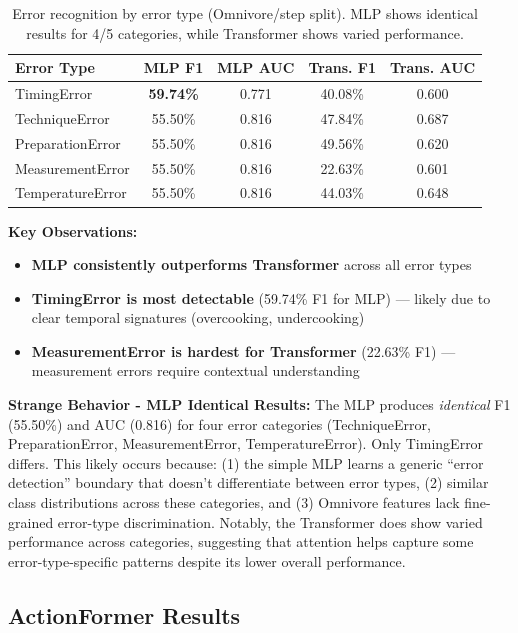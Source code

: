 \documentclass[10pt,twocolumn,letterpaper]{article}
\newcommand{\tighttabcolsep}{\setlength{\tabcolsep}{3pt}}
\newcommand{\tighttablerowstretch}{\renewcommand{\arraystretch}{1.05}}
\begin{document}
\begin{table}[h]
\centering
\caption{Error recognition by error type (Omnivore/step split). MLP shows identical results for 4/5 categories, while Transformer shows varied performance.}
\label{tab:error_types}
{\small\tighttabcolsep\tighttablerowstretch
\begin{tabular}{lcccc}
\toprule
Error Type & MLP F1 & MLP AUC & Trans. F1 & Trans. AUC \\
\midrule
TimingError & \textbf{59.74\%} & 0.771 & 40.08\% & 0.600 \\
TechniqueError & 55.50\% & 0.816 & 47.84\% & 0.687 \\
PreparationError & 55.50\% & 0.816 & 49.56\% & 0.620 \\
MeasurementError & 55.50\% & 0.816 & 22.63\% & 0.601 \\
TemperatureError & 55.50\% & 0.816 & 44.03\% & 0.648 \\
\bottomrule
\end{tabular}
}
\end{table}

\textbf{Key Observations:}
\begin{itemize}
    \item \textbf{MLP consistently outperforms Transformer} across all error types
    \item \textbf{TimingError is most detectable} (59.74\% F1 for MLP) --- likely due to clear temporal signatures (overcooking, undercooking)
    \item \textbf{MeasurementError is hardest for Transformer} (22.63\% F1) --- measurement errors require contextual understanding
\end{itemize}

\textbf{Strange Behavior - MLP Identical Results:} The MLP produces \textit{identical} F1 (55.50\%) and AUC (0.816) for four error categories (TechniqueError, PreparationError, MeasurementError, TemperatureError). Only TimingError differs. This likely occurs because: (1) the simple MLP learns a generic ``error detection'' boundary that doesn't differentiate between error types, (2) similar class distributions across these categories, and (3) Omnivore features lack fine-grained error-type discrimination. Notably, the Transformer does show varied performance across categories, suggesting that attention helps capture some error-type-specific patterns despite its lower overall performance.

\subsection{ActionFormer Results}
\end{document}
